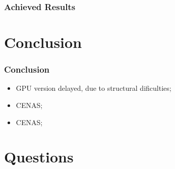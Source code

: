 \documentclass{beamer}
\begin{document}
\begin{frame}
	\frametitle{Achieved Results}

\end{frame}



\section{Conclusion}
\begin{frame}
	\frametitle{Conclusion}
	\begin{itemize}
		\item GPU version delayed, due to structural dificulties;
		\item CENAS;
		\item CENAS;
	\end{itemize}
\end{frame}

\section{Questions}
\begin{frame}
	\titlepage
	
	
\end{frame}
\end{document}
